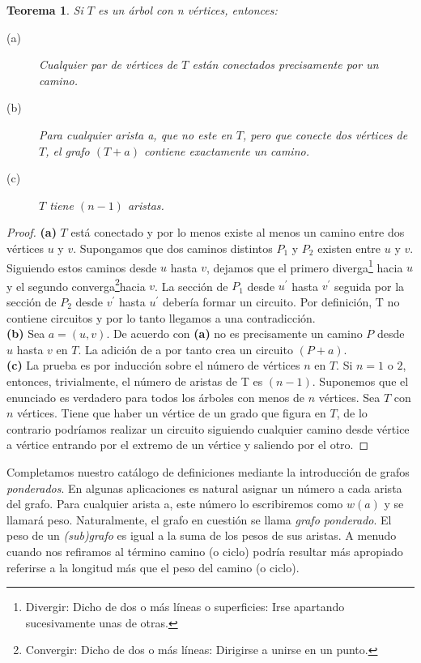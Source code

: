 \documentclass[10pt,a5paper]{book}
\newtheorem{teorema}{Teorema}[chapter]
\begin{document}
\begin{teorema}
\label{teorema1.2}
  Si $T$ es un árbol con n vértices, entonces:
  \begin{description}
  \item[(a)] Cualquier par de vértices de $T$ están conectados precisamente por un camino.
  \item[(b)] Para cualquier arista a, que no este en $T$, pero que conecte dos vértices de $T$, el grafo $(T+a)$ contiene exactamente un camino.
  \item[(c)] $T$ tiene $(n-1)$ aristas.
  \end{description}
\end{teorema}
\begin{proof}
  \textbf{(a)} $T$ está conectado y por lo menos existe al menos un camino entre dos vértices $u$ y $v$. Supongamos que dos caminos distintos $P_1$ y $P_2$ existen entre $u$ y $v$. Siguiendo estos caminos desde $u$ hasta $v$, dejamos que el primero diverga\footnote{Divergir: Dicho de dos o más líneas o superficies: Irse apartando sucesivamente unas de otras.} hacia $u$ y el segundo converga\footnote{Convergir: Dicho de dos o más líneas: Dirigirse a unirse en un punto.}hacia $v$. La sección de $P_1$ desde $u^{'}$ hasta $v^{'}$ seguida por la sección de $P_2$ desde $v^{'}$ hasta $u^{'}$ debería formar un circuito. Por definición, T no contiene circuitos y por lo tanto llegamos a una contradicción.\\
  \textbf{(b)} Sea $a = (u,v)$. De acuerdo con \textbf{(a)} no es precisamente un camino $P$ desde $u$ hasta $v$ en $T$. La adición de a por tanto crea un circuito $(P+a)$.\\
  \textbf{(c)} La prueba es por inducción sobre el número de vértices $n$ en $T$. Si $n=1$ o $2$, entonces, trivialmente, el número de aristas de T es $(n-1)$. Suponemos que el enunciado es verdadero para todos los árboles con menos de $n$ vértices. Sea $T$ con $n$ vértices. Tiene que haber un vértice de un grado que figura en $T$, de lo contrario podríamos realizar un circuito siguiendo cualquier camino desde vértice a vértice entrando por el extremo de un vértice y saliendo por el otro.
\end{proof}

Completamos nuestro catálogo de definiciones mediante la introducción de grafos \emph{ponderados}. En algunas aplicaciones es natural asignar un número a cada arista del grafo. Para cualquier arista a, este número lo escribiremos como $w(a)$ y se llamará peso. Naturalmente, el grafo en cuestión se llama \emph{grafo ponderado}. El peso de un \emph{(sub)grafo} es igual a la suma de los pesos de sus aristas. A menudo cuando nos refiramos al término camino (o ciclo) podría resultar más apropiado referirse a la longitud más que el peso del camino (o ciclo).
\end{document}
